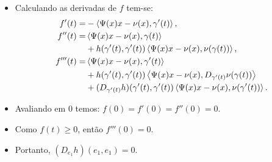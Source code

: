 \documentclass[12pt,a4paper]{beamer}
\theoremstyle{definition}
\begin{document}
\begin{frame}

	\begin{itemize}

		\item Calculando as derivadas de $f$ tem-se:
		\begin{align*}
		f'(t) =& -\left\langle \Psi(x)x - \nu(x),\gamma'(t) \right\rangle,\\
		f''(t) =& \left\langle \Psi(x)x - \nu(x),\gamma(t) \right\rangle\\
		& + h(\gamma'(t),\gamma'(t)) \left\langle \Psi(x)x - \nu(x),\nu(\gamma(t)) \right\rangle,\\
		f'''(t) =& \left\langle \Psi(x)x - \nu(x),\gamma'(t) \right\rangle\\
		& + h(\gamma'(t),\gamma'(t)) \left\langle \Psi(x)x - \nu(x),D_{\gamma'(t)} \nu(\gamma(t)) \right\rangle\\
		& + (D_{\gamma'(t)} h) (\gamma'(t),\gamma'(t)) \left\langle \Psi(x)x - \nu(x),\nu(\gamma'(t)) \right\rangle.
		\end{align*}
	
		\pause
		
		\item Avaliando em $0$ temos: $f(0)=f'(0)=f''(0)=0$.
		
		\pause
		
		\item Como $f(t) \geq 0$, então $f'''(0)=0$.
		
		\pause
		
		\item Portanto, $(D_{e_1}h)(e_1,e_1)=0$.
		
	\end{itemize}

\end{frame}
\end{document}
